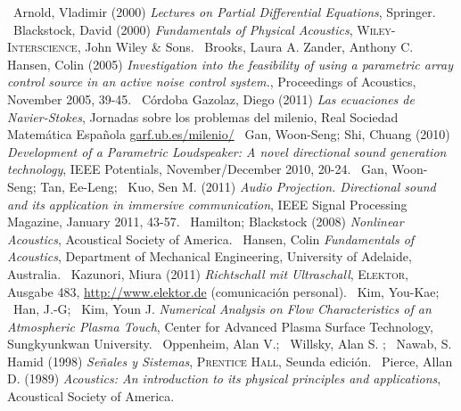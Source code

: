 % 

\begin{thebibliography}{9999}
 ~Arnold, Vladimir (2000) 
\emph{Lectures on Partial Differential Equations}, Springer.
 ~Blackstock, David (2000)
\emph{Fundamentals of Physical Acoustics}, \textsc{Wiley-Interscience}, John Wiley \& Sons.
 ~Brooks, Laura A.  Zander, Anthony C.  Hansen, Colin (2005)
\emph{Investigation into the feasibility of using a parametric array control source in an active noise control system.}, Proceedings of Acoustics, November 2005, 39-45.
 ~Córdoba Gazolaz, Diego (2011)
\emph{Las ecuaciones de Navier-Stokes}, Jornadas sobre los problemas del milenio, Real Sociedad Matemática Española \url{garf.ub.es/milenio/}
 ~Gan, Woon-Seng; Shi, Chuang (2010)
\emph{Development of a Parametric Loudspeaker: A novel directional sound generation technology}, IEEE Potentials, November/December 2010, 20-24.
 ~Gan, Woon-Seng; Tan, Ee-Leng; ~Kuo, Sen M. (2011)
\emph{Audio Projection. Directional sound and its application in immersive communication}, IEEE Signal Processing Magazine, January 2011, 43-57.
 ~Hamilton; Blackstock (2008)
\emph{Nonlinear Acoustics}, Acoustical Society of America.
 ~Hansen, Colin \emph{Fundamentals of Acoustics}, Department of Mechanical Engineering, University of Adelaide, Australia.
 ~Kazunori, Miura (2011)
\emph{Richtschall mit Ultraschall},  \textsc{Elektor}, Ausgabe 483, \url{http://www.elektor.de} (comunicación personal).
 ~Kim, You-Kae; ~Han, J.-G; ~Kim, Youn J.
\emph{Numerical Analysis on Flow Characteristics of an Atmospheric Plasma Touch}, Center for Advanced Plasma Surface Technology, Sungkyunkwan University.
 ~Oppenheim, Alan V.; ~Willsky, Alan S. ; ~Nawab, S. Hamid (1998)
\emph{Señales y Sistemas}, \textsc{Prentice Hall}, Seunda edición.
 ~Pierce, Allan D. (1989)
\emph{Acoustics: An introduction to its physical principles and applications}, Acoustical Society of America.

\end{thebibliography}
